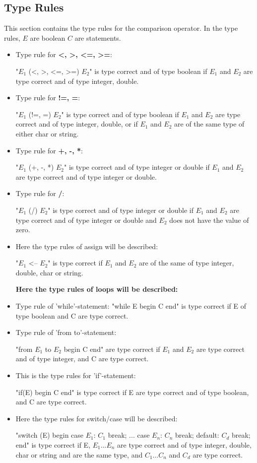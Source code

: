 \subsection{Type Rules} %
This section contains the type rules for the comparison operator. In the type rules, $E$ are boolean $C$ are statements.
\begin{itemize}
\item Type rule for \textbf{<, >, <=, >=}:

"$E_1$ (<, >, <=, >=) $E_2$" is type correct and of type boolean if $E_1$ and $E_2$ are type correct and of type integer, double.

\item Type rule for \textbf{!=, =}:

"$E_1$ (!=, =) $E_2$" is type correct and of type boolean if $E_1$ and $E_2$ are type correct and of type integer, double, or if $E_1$ and $E_2$ are of the same type of either char or string.

\item Type rule for \textbf{+, -, *}:

"$E_1$ (+, -, *) $E_2$" is type correct and of type integer or double if $E_1$ and $E_2$ are type correct and of type integer or double.

\item Type rule for \textbf{/}:

"$E_1$ (/) $E_2$" is type correct and of type integer or double if $E_1$ and $E_2$ are type correct and of type integer or double and $E_2$ does not have the value of zero.

\item Here the type rules of assign will be described:

"$E_1$ <-- $E_2$" is type correct if $E_1$ and $E_2$ are of the same of type integer, double, char or string.

\textbf{Here the type rules of loops will be described:}

\item Type rule of 'while'-statement: 
"while E begin C end" is type correct if E of type boolean and C are type correct.

\item Type rule of 'from to'-statement: 

"from $E_1$ to $E_2$ begin C end" are type correct if $E_1$ and $E_2$ are type correct and of type integer, and C are type correct.

\item This is the type rules for 'if'-statement:

"if(E) begin C end" is type correct if E are type correct and of type boolean, and C are type correct.

\item Here the type rules for switch/case will be described:

"switch (E) begin case $E_1$: $C_1$ break; ... case $E_n$: $C_n$ break; default: $C_d$ break; end" is type correct if E, $E_1$...$E_n$ are type correct and of type integer, double, char or string and are the same type, and $C_1$...$C_n$ and $C_d$ are type correct.
\end{itemize}